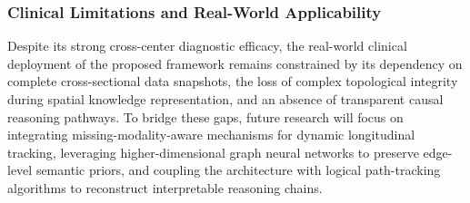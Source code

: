 \documentclass[lettersize,journal]{IEEEtran}
\begin{document}
\subsubsection{Clinical Limitations and Real-World Applicability}

Despite its strong cross-center diagnostic efficacy, the real-world clinical deployment of the proposed framework remains constrained by its dependency on complete cross-sectional data snapshots, the loss of complex topological integrity during spatial knowledge representation, and an absence of transparent causal reasoning pathways. To bridge these gaps, future research will focus on integrating missing-modality-aware mechanisms for dynamic longitudinal tracking, leveraging higher-dimensional graph neural networks to preserve edge-level semantic priors, and coupling the architecture with logical path-tracking algorithms to reconstruct interpretable reasoning chains.


	




    

	
	







\vfill
\end{document}
